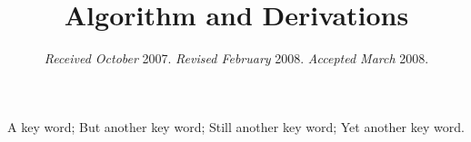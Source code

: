\documentclass[useAMS,referee]{biom}
\title{
Algorithm and Derivations}
\begin{document}

\date{{\it Received October} 2007. {\it Revised February} 2008.  {\it
Accepted March} 2008.}








\label{firstpage}




%

\begin{keywords}
A key word; But another key word; Still another key word; Yet another key word.
\end{keywords}

\end{document}
